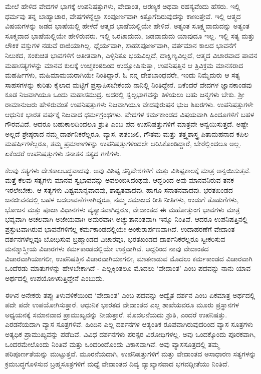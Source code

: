 ಮೇಲೆ ಹೇಳಿದ ವೇದಗಳ ಭಾಗಕ್ಕೆ ಉಪನಿಷತ್ತುಗಳು, ವೇದಾಂತ, ಆರಣ್ಯಕ ಅಥವಾ ರಹಸ್ಯವೆಂದು ಹೆಸರು. ಇಲ್ಲಿ ಧರ್ಮವು ತನ್ನ ಬಾಹ್ಯಾಚಾರ, ವೇಷಗಳನ್ನೆಲ್ಲಾ ಸಂಪೂರ್ಣವಾಗಿ ಕಿತ್ತೊಗೆದಿರುವುದನ್ನು ಕಾಣುತ್ತೇವೆ. ಇಲ್ಲಿ ಆತ್ಮದ ವಿಷಯಗಳನ್ನು ಜಡದ ಭಾಷೆಯಲ್ಲಿ ಹೇಳದೆ ಆತ್ಮದ ಭಾಷೆಯಲ್ಲಿಯೇ ಹೇಳಿದೆ. ಅತ್ಯಂತ ಸೂಕ್ಷ್ಮವಾದುದನ್ನು ಅತ್ಯಂತ ಸೂಕ್ಮವಾದ ಭಾಷೆಯಲ್ಲಿಯೇ ಹೇಳಿರುವರು. ಇಲ್ಲಿ ಒರಟಾದುದು, ಜಡವಾದುದು ಯಾವುದೂ ಇಲ್ಲ. ಇಲ್ಲಿ ಸತ್ಯ ಮತ್ತು ಲೌಕಿಕ ವಸ್ತುಗಳ ನಡುವೆ ರಾಜಿಯಾಗಿಲ್ಲ. ಧೈರ್ಯವಾಗಿ, ಸಾಹಸಪೂರ್ಣವಾಗಿ, ವರ್ತಮಾನ ಕಾಲದ ಭಾವನೆಗೆ ನಿಲುಕದ, ಸಂಕುಚಿತ ಭಾವಗಳಿಗೆ ಅತೀತವಾಗಿ, ಎಳ್ಳಿನಿತೂ ಭಯವಿಲ್ಲದೆ, ದಾಕ್ಷಿಣ್ಯವಿಲ್ಲದೆ, ಆತ್ಮದ ವಿಚಾರವಾದ ಪಾವನ ಮಹಾಸತ್ಯಗಳನ್ನು ಮಾನವ ಕುಲಕ್ಕೆ ಉಚ್ಚಕಂಠದಿಂದ ಉದ್ಘೋಷಿಸುತ್ತಾ, ಉಪನಿಷತ್ತಿನ ಆ ತ್ರಿವಿಕ್ರಮ ಮಾನಸರಾದ ಮಹರ್ಷಿಗಳು, ಮಹಿಮಾಮಯರಾಗಿಯೇ ನಿಂತಿದ್ದಾರೆ. ಓ ನನ್ನ ದೇಶಬಾಂಧವರೇ, ಇಂದು ನಿಮ್ಮೆದುರು ಆ ಸತ್ಯ ಸಾಹಸಗಳನ್ನು ಕುರಿತು ಕೈಲಾದ ಮಟ್ಟಿಗೆ ಪ್ರಸ್ತಾಪಿಸಬೇಕೆಂದು ನಾನಿಲ್ಲಿ ನಿಂತಿದ್ದೇನೆ. ಏಕೆಂದರೆ ವೇದಗಳ ಜ್ಞಾನಕಾಂಡವು ಕೂಡ ನಿಜವಾಗಿಯೂ ಒಂದು ಮಹಾಸಮುದ್ರ. ಅದರಲ್ಲಿ ಸ್ವಲ್ಪಭಾಗವನ್ನು ತಿಳಿಯಲು ಬಹು ಜನ್ಮಗಳು ಬೇಕು. ಶ‍್ರೀ ರಾಮಾನುಜರು ಹೇಳಿರುವಂತೆ ಉಪನಿಷತ್ತುಗಳು ನಿಜವಾಗಿಯೂ ವೇದಪುರುಷನ ಭುಜ ಶಿಖರಗಳು. ಉಪನಿಷತ್ತುಗಳೇ ಆಧುನಿಕ ಭಾರತ ವರ್ಷಕ್ಕೆ ನಿಜವಾದ ಧರ್ಮಗ್ರಂಥಗಳು. ವೇದಗಳ ಕರ್ಮಕಾಂಡದ ವಿಷಯವಾಗಿ ಹಿಂದೂಗಳಿಗೆ ಬಹಳ ಗೌರವವಿದೆ. ಆದರೂ ಬಹುಕಾಲದಿಂದಲೂ ಶ್ರುತಿ ಎಂಬ ಪದ ಉಪನಿಷತ್ತುಗಳಿಗೆ ಮಾತ್ರವೇ ಅನ್ವಯಿಸುತ್ತದೆ. ಅಷ್ಟೇ ಅಲ್ಲದೆ ಶ್ರೇಷ್ಠರಾದ ನಮ್ಮ ದಾರ್ಶನಿಕರೆಲ್ಲರೂ, ವ್ಯಾಸ, ಪತಂಜಲಿ, ಗೌತಮ ಮತ್ತು ತತ್ತ್ವಶಾಸ್ತ್ರ ಪಿತಾಮಹನಾದ ಕಪಿಲ ಮಹರ್ಷಿಗಳೆಲ್ಲರೂ, ತಮ್ಮ ಪ್ರಮಾಣಗಳನ್ನು ಉಪನಿಷತ್ತುಗಳಿಂದಲೇ ಆರಿಸಿಕೊಂಡಿದ್ದಾರೆ, ಬೇರೆಲ್ಲಿಂದಲೂ ಅಲ್ಲ. ಏಕೆಂದರೆ ಉಪನಿಷತ್ತುಗಳು ಸನಾತನ ಸತ್ಯದ ಗಣಿಗಳು.

ಕೆಲವು ಸತ್ಯಗಳು ದೇಶಕಾಲಬದ್ಧವಾದವು. ಅವು ವಿಶಿಷ್ಟ ಸನ್ನಿವೇಶಗಳಿಗೆ ಮತ್ತು ವಿಶಿಷ್ಟಕಾಲಕ್ಕೆ ಮಾತ್ರ ಅನ್ವಯಿಸುತ್ತವೆ. ಮತ್ತೆ ಕೆಲವು ಸತ್ಯಗಳು ಮಾನವ ಸ್ವಭಾವವನ್ನು ಅವಲಂಬಿಸಿದಂಥವು. ಆದ್ದರಿಂದ ಅವು ಮಾನವನಿರುವ ತನಕ ಇರಲೇಬೇಕು. ಆ ಸತ್ಯಗಳು ವಿಶ್ವಮಾನ್ಯವಾದವು, ಶಾಶ್ವತವಾದವು, ಹಾಗೂ ಸನಾತನವಾದವು. ಭರತಖಂಡದ ಜನಜೀವನದಲ್ಲಿ ಬಹಳ ಬದಲಾವಣೆಗಳಾಗಿದ್ದರೂ, ನಮ್ಮ ಸಮಾಜದ ರೀತಿ ನೀತಿಗಳು, ಉಡುಗೆ ತೊಡುಗೆಗಳು, ಭೋಜನ ಮತ್ತು ಪೂಜಾ ವಿಧಾನಗಳು ವ್ಯತ್ಯಾಸವಾಗಿದ್ದರೂ, ವೇದಾಂತದ ಈ ಮಹೋತ್ತುಂಗ ಭಾವಗಳು ಮಾತ್ರ ಭವ್ಯವಾಗಿ ಅಚಲವಾಗಿ ಅಜೇಯವಾಗಿ ಅಮರವಾಗಿ ಅಚ್ಯುತಾನಂತವಾಗಿ ಇನ್ನೂ ನಿಂತಿವೆ. ಆದರೂ ಉಪನಿಷತ್ತಿನಲ್ಲಿ ಪ್ರಸ್ಫುಟವಾಗಿರುವ ಭಾವನೆಗಳಿಗೆಲ್ಲ ಕರ್ಮಕಾಂಡದಲ್ಲಿಯೇ ಅಂಕುರಾರ್ಪಣವಾಗಿದೆ. ಉದಾಹರಣೆಗೆ ವೇದಾಂತ ದರ್ಶನಗಳೆಲ್ಲವೂ ಬೋಧಿಸುವ ಬ್ರಹ್ಮಾಂಡದ ವಿಚಾರವೂ, ಭರತಖಂಡದ ದಾರ್ಶನಿಕರೆಲ್ಲರೂ ಸ್ವೀಕರಿಸುವ ಮನಶ್ಶಾಸ್ತ್ರೀಯ ವಿಚಾರಗಳು ಕರ್ಮಕಾಂಡದಲ್ಲಿಯೇ ಉಕ್ತವಾಗಿವೆ. ಆದ್ದರಿಂದ ನಾವು ವೇದಾಂತದ ವಿಚಾರವಾಗಿಯಾಗಲೀ, ಉಪನಿಷತ್ತಿನ ವಿಚಾರವಾಗಿಯಾಗಲೀ, ಮಾತನಾಡುವ ಮೊದಲು ಕರ್ಮಕಾಂಡದ ವಿಚಾರವಾಗಿ ಒಂದೆರಡು ಮಾತುಗಳನ್ನು ಹೇಳಬೇಕಾಗಿದೆ - ಎಲ್ಲಕ್ಕಿಂತಲೂ ಮೊದಲು ‘ವೇದಾಂತ’ ಎಂಬ ಪದವನ್ನು ನಾನು ಯಾವ ಅರ್ಥದಲ್ಲಿ ಉಪಯೋಗಿಸುತ್ತಿದ್ದೇನೆ ಎಂಬುದು.

ಈಗಿನ ಅನೇಕರು ತಪ್ಪು ತಿಳುವಳಿಕೆಯಿಂದ ‘ವೇದಾಂತ’ ಎಂಬ ಪದವನ್ನು ಅದ್ವೈತ ದರ್ಶನ ಎಂಬ ಏಕಮಾತ್ರ ಅರ್ಥದಲ್ಲಿ ಪದೇ ಪದೇ ಉಪಯೋಗಿಸುತ್ತಾರೆ. ಆಧುನಿಕ ಭಾರತದ ವೇದಾಂತದ ಎಲ್ಲ ಶಾಖೆಯವರೂ ಮೂರು ಪ್ರಸ್ಥಾನಗಳ ಅಧ್ಯಯನಕ್ಕೆ ಸಮಾನವಾದ ಪ್ರಾಮುಖ್ಯವನ್ನು ನೀಡುತ್ತಾರೆ. ಮೊದಲನೆಯದು ಶ್ರುತಿ, ಎಂದರೆ ಉಪನಿಷತ್ತು. ಎರಡನೆಯದಾಗಿ ವ್ಯಾಸ ಸೂತ್ರಗಳಿವೆ. ಹಿಂದಿನ ಎಲ್ಲ ದರ್ಶನಗಳ ಆತ್ಯಂತಿಕ ರೂಪವಾಗಿರುವುದರಿಂದ ವ್ಯಾಸ ಸೂತ್ರಗಳು ಅತ್ಯಧಿಕ ಪ್ರಾಮುಖ್ಯವನ್ನು ಪಡೆದಿವೆ. ವಿವಿಧ ದರ್ಶನಗಳು ಪರಸ್ಪರ ವಿರೋಧಿಗಳಲ್ಲ. ಅವು ಒಂದಕ್ಕೊಂದು ಪೂರಕವಾಗಿ, ಒಂದರಮೇಲೊಂದು ನಿಂತಿವೆ ಮತ್ತು ಒಂದರಿಂದೊಂದು ವಿಕಾಸವಾಗಿವೆ. ಅವು ವ್ಯಾಸಸೂತ್ರದಲ್ಲಿ ತಮ್ಮ ಪರಿಪೂರ್ಣತೆಯನ್ನು ಮುಟ್ಟುತ್ತವೆ. ಮೂರನೆಯದಾಗಿ, ಉಪನಿಷತ್ತುಗಳಿಗೆ ಮತ್ತು ವೇದಾಂತದ ಅಸಾಧಾರಣ ಸತ್ಯಗಳನ್ನು ಕ್ರಮಬದ್ಧಗೊಳಿಸುವ ಬ್ರಹ್ಮಸೂತ್ರಗಳಿಗೆ ಮಧ್ಯೆ ವೇದಾಂತದ ದಿವ್ಯ ವ್ಯಾಖ್ಯಾನವಾದ ಭಗವದ್ಗೀತೆಯು ನಿಂತಿದೆ.

